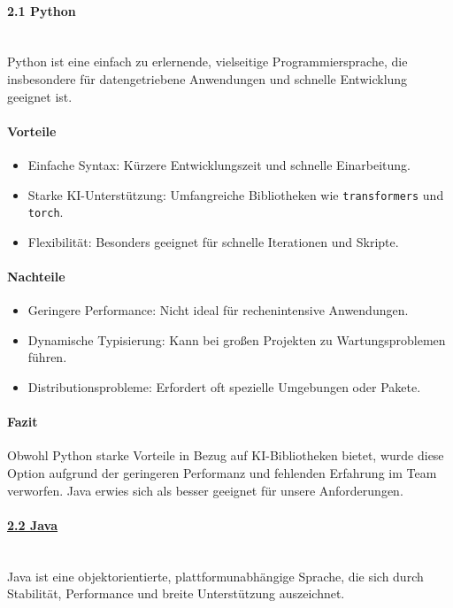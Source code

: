 \documentclass[a4paper,12pt]{report}
\begin{document}
    \paragraph{2.1 Python}\mbox{}\\
    Python ist eine einfach zu erlernende, vielseitige Programmiersprache, die insbesondere für datengetriebene Anwendungen und schnelle Entwicklung geeignet ist.

    \paragraph{Vorteile}
    \begin{itemize}
        \item Einfache Syntax: Kürzere Entwicklungszeit und schnelle Einarbeitung.
        \item Starke KI-Unterstützung: Umfangreiche Bibliotheken wie \texttt{transformers} und \texttt{torch}.
        \item Flexibilität: Besonders geeignet für schnelle Iterationen und Skripte.
    \end{itemize}

    \paragraph{Nachteile}
    \begin{itemize}
        \item Geringere Performance: Nicht ideal für rechenintensive Anwendungen.
        \item Dynamische Typisierung: Kann bei großen Projekten zu Wartungsproblemen führen.
        \item Distributionsprobleme: Erfordert oft spezielle Umgebungen oder Pakete.
    \end{itemize}

    \paragraph{Fazit}
    Obwohl Python starke Vorteile in Bezug auf KI-Bibliotheken bietet, wurde diese Option aufgrund der geringeren Performanz und fehlenden Erfahrung im Team verworfen.
    Java erwies sich als besser geeignet für unsere Anforderungen.

    \paragraph{\underline{2.2 Java}}\mbox{}\\
    Java ist eine objektorientierte, plattformunabhängige Sprache, die sich durch Stabilität, Performance und breite Unterstützung auszeichnet.
\end{document}
